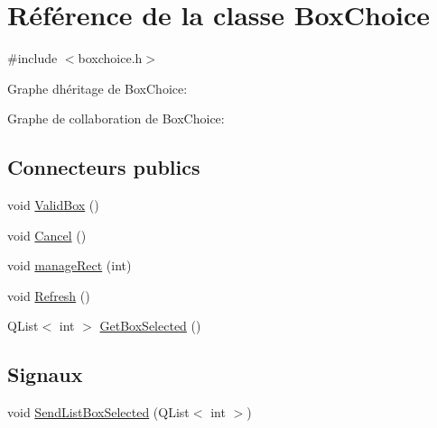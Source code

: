 \hypertarget{class_box_choice}{}\section{Référence de la classe Box\+Choice}
\label{class_box_choice}


{\ttfamily \#include $<$boxchoice.\+h$>$}



Graphe d\textquotesingle{}héritage de Box\+Choice\+:


Graphe de collaboration de Box\+Choice\+:
\subsection*{Connecteurs publics}
\begin{DoxyCompactItemize}
\item 
void \hyperlink{class_box_choice_af173283ef00245af80b178351288283d}{Valid\+Box} ()
\item 
void \hyperlink{class_box_choice_a583dbd3049b503c9e62568d931f11540}{Cancel} ()
\item 
void \hyperlink{class_box_choice_af67a20b330b0f23c73d643d403b3e9e4}{manage\+Rect} (int)
\item 
void \hyperlink{class_box_choice_a857de1787d4cbcf15c4575b3e72f8dc0}{Refresh} ()
\item 
Q\+List$<$ int $>$ \hyperlink{class_box_choice_ae506504f462483f2907b550cc6744ed1}{Get\+Box\+Selected} ()
\end{DoxyCompactItemize}
\subsection*{Signaux}
\begin{DoxyCompactItemize}
\item 
void \hyperlink{class_box_choice_aae9daa203d1d9c6ad99ed355c811358a}{Send\+List\+Box\+Selected} (Q\+List$<$ int $>$)
\end{DoxyCompactItemize}

